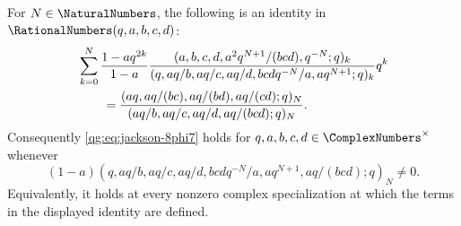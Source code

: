 \begin{theorem}
\label{qg:thm-jackson-8phi7}
For $N\in\NaturalNumbers$, the following is an identity in
$\RationalNumbers(q,a,b,c,d)$:
\begin{align}
&\sum_{k=0}^{N}
 \frac{1-aq^{2k}}{1-a}
 \frac{(a,b,c,d,a^2q^{N+1}/(bcd),q^{-N};q)_k}
 {(q,aq/b,aq/c,aq/d,bcdq^{-N}/a,aq^{N+1};q)_k}q^k
 \notag\\
&\qquad=
 \frac{(aq,aq/(bc),aq/(bd),aq/(cd);q)_N}
 {(aq/b,aq/c,aq/d,aq/(bcd);q)_N}.
\label{qg:eq:jackson-8phi7}
\end{align}
Consequently \eqref{qg:eq:jackson-8phi7} holds for
$q,a,b,c,d\in\ComplexNumbers^\times$ whenever
\[
 (1-a)
 (q,aq/b,aq/c,aq/d,bcdq^{-N}/a,aq^{N+1},aq/(bcd);q)_N
 \ne0.
\]
Equivalently, it holds at every nonzero complex specialization at which the
terms in the displayed identity are defined.
\end{theorem}

